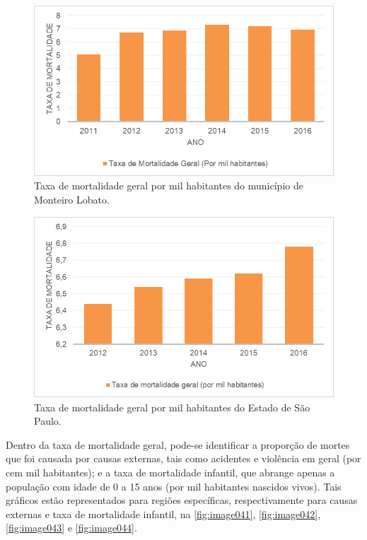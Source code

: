  \begin{figure}[h!]
	\centering
	\includegraphics[width=0.9\linewidth]{produtos/proddois/image039}
	\caption{Taxa de mortalidade geral por mil habitantes do município de Monteiro Lobato.}
	\label{fig:image039}
\end{figure}

 \begin{figure}[h!]
	\centering
	\includegraphics[width=0.9\linewidth]{produtos/proddois/image040}
	\caption{Taxa de mortalidade geral por mil habitantes do Estado de São Paulo.}
	\label{fig:image040}
\end{figure}
\clearpage
Dentro da taxa de mortalidade geral, pode-se identificar a proporção de mortes que foi causada por causas externas, tais como acidentes e violência em geral (por cem mil habitantes); e a taxa de mortalidade infantil, que abrange apenas a população com idade de 0 a 15 anos (por mil habitantes nascidos vivos). Tais gráficos estão representados para regiões específicas, respectivamente para causas externas e taxa de mortalidade infantil, na \autoref{fig:image041},  \autoref{fig:image042}, \autoref{fig:image043} e \autoref{fig:image044}.

